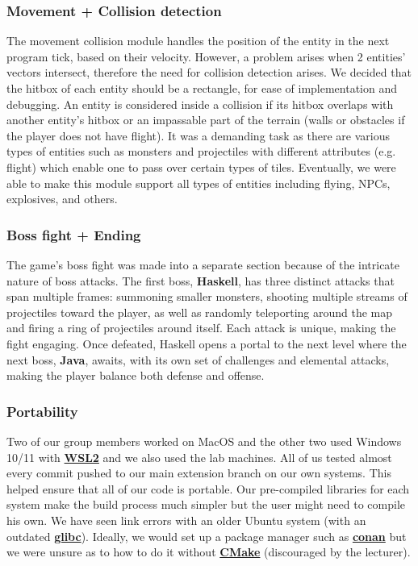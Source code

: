 \documentclass{article}
\begin{document}
\subsubsection{Movement + Collision detection}
The movement collision module handles the position of the entity in the next program tick, based on their velocity. However, a problem arises when 2 entities' vectors intersect, therefore the need for collision detection arises. We decided that the hitbox of each entity should be a rectangle, for ease of implementation and debugging. An entity is considered inside a collision if its hitbox overlaps with another entity’s hitbox or an impassable part of the terrain (walls or obstacles if the player does not have flight). It was a demanding task as there are various types of entities such as monsters and projectiles with different attributes (e.g. flight) which enable one to pass over certain types of tiles. Eventually, we were able to make this module support all types of entities including flying, NPCs, explosives, and others. 
\subsubsection{Boss fight + Ending}
The game’s boss fight was made into a separate section because of the intricate nature of boss attacks. The first boss, \textbf{Haskell}, has three distinct attacks that span multiple frames: summoning smaller monsters, shooting multiple streams of projectiles toward the player, as well as randomly teleporting around the map and firing a ring of projectiles around itself. Each attack is unique, making the fight engaging. Once defeated, Haskell opens a portal to the next level where the next boss, \textbf{Java}, awaits, with its own set of challenges and elemental attacks, making the player balance both defense and offense.
\subsubsection{Portability}
Two of our group members worked on MacOS and the other two used Windows 10/11 with \href{https://learn.microsoft.com/en-us/windows/wsl/}{\textbf{WSL2}} and we also used the lab machines. All of us tested almost every commit pushed to our main extension branch on our own systems. This helped ensure that all of our code is portable. Our pre-compiled libraries for each system make the build process much simpler but the user might need to compile his own. We have seen link errors with an older Ubuntu system (with an outdated \href{https://www.gnu.org/software/libc/glibc}{\textbf{glibc}}). Ideally, we would set up a package manager such as \href{https://conan.io/}{\textbf{conan}} but we were unsure as to how to do it without \href{https://cmake.org}{\textbf{CMake}} (discouraged by the lecturer).
\end{document}
